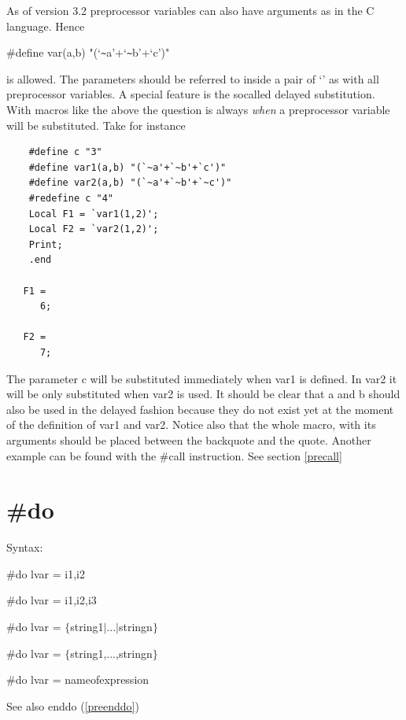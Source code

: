 As of version 3.2 preprocessor variables can also have arguments as in the 
C language. Hence

\#define var(a,b) "(`\verb:~:a'+`\verb:~:b'+`c')"

is allowed. The parameters should be referred to inside a pair of `' as 
with all preprocessor variables. A special feature is the socalled 
delayed 
substitution. With macros like the above the 
question is always {\sl when} a preprocessor variable will be substituted. 
Take for instance
\begin{verbatim}
    #define c "3"
    #define var1(a,b) "(`~a'+`~b'+`c')"
    #define var2(a,b) "(`~a'+`~b'+`~c')"
    #redefine c "4"
    Local F1 = `var1(1,2)';
    Local F2 = `var2(1,2)';
    Print;
    .end

   F1 =
      6;

   F2 =
      7;
\end{verbatim}
The parameter c will be substituted immediately when var1 is defined. In 
var2 it will be only substituted when var2 is used. It should be clear that 
a and b should also be used in the delayed fashion because they do not 
exist yet at the moment of the definition of var1 and var2. Notice also 
that the whole macro, with its arguments should be placed 
between the backquote and the quote. Another example can be found with the 
\#call instruction. See section \ref{precall}

 
\section{\#do}
\label{predo}

\noindent Syntax:

\#do lvar = i1,i2

\#do lvar = i1,i2,i3

\#do lvar = $\{$string1$|$...$|$stringn$\}$

\#do lvar = $\{$string1,...,stringn$\}$

\#do lvar = nameofexpression
 
\noindent See also enddo (\ref{preenddo})

